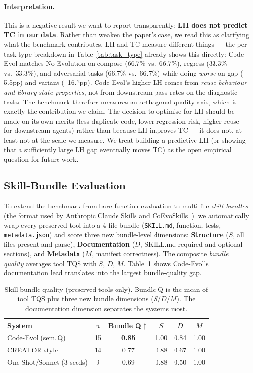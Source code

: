 \documentclass[sigconf,anonymous,review,natbib=false]{acmart}
\begin{document}
\paragraph{Interpretation.} This is a negative result we want to report transparently: \textbf{LH does not predict TC in our data}. Rather than weaken the paper's case, we read this as clarifying what the benchmark contributes. LH and TC measure different things --- the per-task-type breakdown in Table~\ref{tab:task_type} already shows this directly: Code-Evol matches No-Evolution on compose (66.7\% vs.\ 66.7\%), regress (33.3\% vs.\ 33.3\%), and adversarial tasks (66.7\% vs.\ 66.7\%) while doing \emph{worse} on gap (--5.5pp) and variant (--16.7pp). Code-Evol's higher LH comes from \emph{reuse behaviour and library-state properties}, not from downstream pass rates on the diagnostic tasks. The benchmark therefore measures an orthogonal quality axis, which is exactly the contribution we claim. The decision to optimise for LH should be made on its own merits (less duplicate code, lower regression risk, higher reuse for downstream agents) rather than because LH improves TC --- it does not, at least not at the scale we measure. We treat building a predictive LH (or showing that a sufficiently large LH gap eventually moves TC) as the open empirical question for future work.

\subsection{Skill-Bundle Evaluation}
\label{sec:skill_eval}

To extend the benchmark from bare-function evaluation to multi-file \emph{skill bundles} (the format used by Anthropic Claude Skills and CoEvoSkills~\cite{zhang2026coevoskills}), we automatically wrap every preserved tool into a 4-file bundle (\texttt{SKILL.md}, function, tests, \texttt{metadata.json}) and score three new bundle-level dimensions: \textbf{Structure} ($S$, all files present and parse), \textbf{Documentation} ($D$, SKILL.md required and optional sections), and \textbf{Metadata} ($M$, manifest correctness). The composite \emph{bundle quality} averages tool TQS with $S$, $D$, $M$. Table~\ref{tab:skill_bundles} shows Code-Evol's documentation lead translates into the largest bundle-quality gap.

\begin{table}[t]
\centering\footnotesize
\begin{tabular}{lccccc}
\toprule
\textbf{System} & $n$ & \textbf{Bundle Q}$\uparrow$ & $S$ & $D$ & $M$ \\
\midrule
Code-Evol (sem.\,Q) & 15 & \textbf{0.85} & 1.00 & 0.84 & 1.00 \\
CREATOR-style       & 14 & 0.77 & 0.88 & 0.67 & 1.00 \\
One-Shot/Sonnet (3 seeds) & 9 & 0.69 & 0.88 & 0.50 & 1.00 \\
\bottomrule
\end{tabular}
\caption{Skill-bundle quality (preserved tools only). Bundle Q is the mean of tool TQS plus three new bundle dimensions ($S$/$D$/$M$). The documentation dimension separates the systems most.}
\label{tab:skill_bundles}
\end{table}
\end{document}
